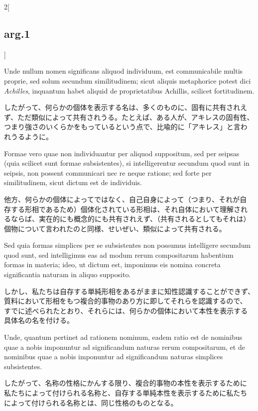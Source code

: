 \documentclass[paper=a4paper,fontsize=10pt,jafontsize=9pt,titlepage]{jlreq}
\begin{document}
\begin{paracol}{2}[\subsection{arg.1}]
\switchcolumn*

Unde nullum nomen significans aliquod individuum, est communicabile
multis proprie, sed solum secundum similitudinem; sicut aliquis
metaphorice potest dici {\itshape Achilles}, inquantum habet aliquid
de proprietatibus Achillis, scilicet fortitudinem.

\switchcolumn

したがって、何らかの個体を表示する名は、多くのものに、固有に共有されえ
ず、ただ類似によって共有されうる。たとえば、ある人が、アキレスの固有性、
つまり強さのいくらかをもっているという点で、比喩的に「アキレス」と言わ
れうるように。

\switchcolumn*

Formae vero quae non individuantur per aliquod suppositum, sed per
seipsas (quia scilicet sunt formae subsistentes), si intelligerentur
secundum quod sunt in seipsis, non possent communicari nec re neque
ratione; sed forte per similitudinem, sicut dictum est de individuis.

\switchcolumn

他方、何らかの個体によってではなく、自己自身によって（つまり、それが自
存する形相であるため）個体化されている形相は、それ自体において理解され
るならば、実在的にも概念的にも共有されえず、（共有されるとしてもそれは）
個物について言われたのと同様、せいぜい、類似によって共有される。

\switchcolumn*

Sed quia formas simplices per se subsistentes non possumus intelligere
secundum quod sunt, sed intelligimus eas ad modum rerum compositarum
habentium formas in materia; ideo, ut dictum est, imponimus eis nomina
concreta significantia naturam in aliquo supposito.

\switchcolumn

しかし、私たちは自存する単純形相をあるがままに知性認識することができず、
質料において形相をもつ複合的事物のあり方に即してそれらを認識するので、
すでに述べられたとおり、それらには、何らかの個体において本性を表示する
具体名の名を付ける。

\switchcolumn*

Unde, quantum pertinet ad rationem nominum, eadem ratio est de
nominibus quae a nobis imponuntur ad significandum naturas rerum
compositarum, et de nominibus quae a nobis imponuntur ad significandum
naturas simplices subsistentes.

\switchcolumn

したがって、名称の性格にかんする限り、複合的事物の本性を表示するために
私たちによって付けられる名称と、自存する単純本性を表示するために私たち
によって付けられる名称とは、同じ性格のものとなる。


\end{paracol}
\end{document}
